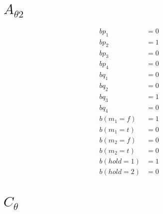 \documentclass{scrartcl}
\begin{document}
\section*{$A_{\theta 2}$}
\begin{align*}
  bp_1 &= 0 \\
  bp_2 &= 1 \\
  bp_3 &= 0 \\
  bp_4 &= 0 \\
  bq_1 &= 0 \\
  bq_2 &= 0 \\
  bq_3 &= 1 \\
  bq_4 &= 0 \\
  b(m_1=f) &= 1 \\
  b(m_1=t) &= 0 \\
  b(m_2=f) &= 0 \\
  b(m_2=t) &= 0 \\
  b(hold=1) &= 1 \\
  b(hold=2) &= 0
\end{align*}

\section*{$C_\theta$}
\end{document}
